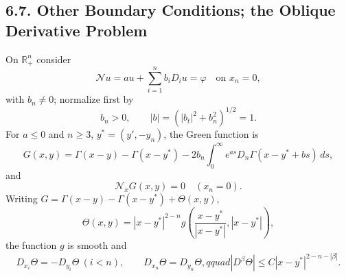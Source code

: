 \subsection*{6.7. Other Boundary Conditions; the Oblique Derivative Problem}

On $\mathbb R^n_+$ consider
\begin{equation}\tag{6.60}
\mathcal Nu=au+\sum_{i=1}^n b_iD_i u=\varphi\quad\text{on }x_n=0,
\end{equation}
with $b_n\ne0$; normalize first by
\begin{equation}
\tag{6.61}
b_n>0,\qquad |b|=(|b_t|^2+b_n^2)^{1/2}=1.
\end{equation}
For $a\le0$ and
$n\ge3$, $y^*=(y',-y_n)$, the Green function is
\begin{equation}\tag{6.62}
G(x,y)=\Gamma(x-y)-\Gamma(x-y^*)-2b_n\int_0^\infty e^{as}D_n\Gamma(x-y^*+bs)\,ds,
\end{equation}
and
\begin{equation}\tag{6.63}
\mathcal N_xG(x,y)=0\quad(x_n=0).
\end{equation}
Writing $G=\Gamma(x-y)-\Gamma(x-y^*)+\Theta(x,y)$,
\[
\Theta(x,y)=|x-y^*|^{2-n}g\!\left(\frac{x-y^*}{|x-y^*|},|x-y^*|\right),
\]
the function $g$ is smooth and
\begin{equation}\label{eq:6.64}\tag{6.64}
D_{x_i}\Theta=-D_{y_i}\Theta\ (i<n),\qquad D_{x_n}\Theta=D_{y_n}\Theta,qquad
|D^\beta\Theta|\le C|x-y^*|^{2-n-|\beta|}.
\end{equation}

